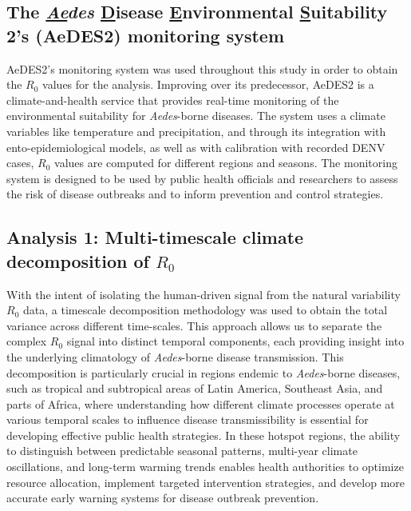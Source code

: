 \documentclass[article,10pt,twocolumn]{wlscirep}
\begin{document}
\subsection{The \textit{\underline{Ae}des} \underline{D}isease \underline{E}nvironmental \underline{S}uitability 2's (AeDES2) monitoring system} \label{sec-methods-aedes2}

AeDES2's monitoring system was used throughout this study in order to obtain the $R_0$ values for the analysis. Improving over its predecessor, AeDES2 is a climate-and-health service that provides real-time monitoring of the environmental suitability for \textit{Aedes}-borne diseases. The system uses a climate variables like temperature and precipitation, and through its integration with ento-epidemiological models, as well as with calibration with recorded DENV cases, $R_0$ values are computed for different regions and seasons. The monitoring system is designed to be used by public health officials and researchers to assess the risk of disease outbreaks and to inform prevention and control strategies.

\subsection{Analysis 1: Multi-timescale climate decomposition of $R_0$} \label{sec-methods-1-analysis}

With the intent of isolating the human-driven signal from the natural variability $R_0$ data, a timescale decomposition methodology was used to obtain the total variance across different time-scales. This approach allows us to separate the complex $R_0$ signal into distinct temporal components, each providing insight into the underlying climatology of \textit{Aedes}-borne disease transmission. This decomposition is particularly crucial in regions endemic to \textit{Aedes}-borne diseases, such as tropical and subtropical areas of Latin America, Southeast Asia, and parts of Africa, where understanding how different climate processes operate at various temporal scales to influence disease transmissibility is essential for developing effective public health strategies. In these hotspot regions, the ability to distinguish between predictable seasonal patterns, multi-year climate oscillations, and long-term warming trends enables health authorities to optimize resource allocation, implement targeted intervention strategies, and develop more accurate early warning systems for disease outbreak prevention.
\end{document}
